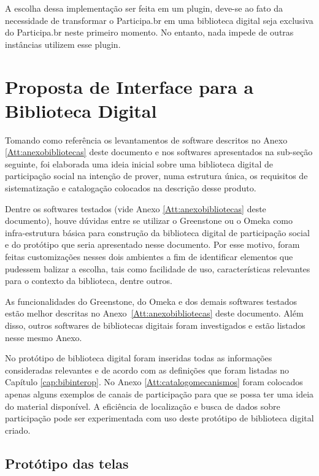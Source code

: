 A escolha dessa implementação ser feita em um plugin, deve-se ao fato da necessidade de transformar o Participa.br em uma biblioteca digital seja exclusiva do Participa.br neste primeiro momento. No entanto, nada impede de outras instâncias utilizem esse plugin.

\section{Proposta de Interface para a Biblioteca Digital}
\label{sub:prototipo_biblioteca}

Tomando como referência os levantamentos de software descritos no Anexo \ref{Att:anexobibliotecas} deste documento e nos softwares apresentados na sub-seção seguinte, foi elaborada uma ideia inicial sobre uma biblioteca digital de participação social na intenção de prover, numa estrutura única, os requisitos de sistematização e catalogação colocados na descrição desse produto.
 
Dentre os softwares testados (vide Anexo \ref{Att:anexobibliotecas} deste documento), houve dúvidas entre se utilizar o Greenstone ou o Omeka como infra-estrutura básica para construção da biblioteca digital de participação social e do protótipo que seria apresentado nesse documento. Por esse motivo, foram feitas customizações nesses dois ambientes a fim de identificar elementos que pudessem balizar a escolha, tais como facilidade de uso, características relevantes para o contexto da biblioteca, dentre outros.

As funcionalidades do Greenstone, do Omeka e dos demais softwares testados estão melhor descritas no Anexo~\ref{Att:anexobibliotecas} deste documento. Além disso, outros softwares de bibliotecas digitais foram investigados e estão listados nesse mesmo Anexo.

No protótipo de biblioteca digital foram inseridas todas as informações consideradas relevantes e de acordo com as definições que foram listadas no Capítulo \ref{cap:bibinterop}. No Anexo \ref{Att:catalogomecanismos} foram colocados apenas alguns exemplos de canais de participação para que se possa ter uma ideia do material disponível. A eficiência de localização e busca de dados sobre participação pode ser experimentada com uso deste protótipo de biblioteca digital criado. 

\subsection*{Protótipo das telas}


